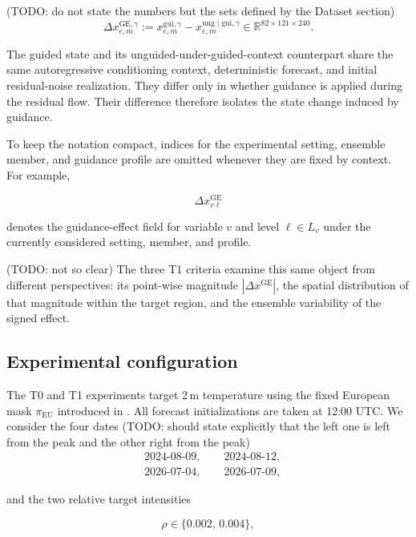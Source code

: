 (TODO: do not state the numbers but the sets defined by the Dataset section)
\begin{equation}
    \Delta x_{e,m}^{\mathrm{GE},\gamma}
    :=
    x_{e,m}^{\mathrm{gui},\gamma}
    -
    x_{e,m}^{\mathrm{ung}\mid\mathrm{gui},\gamma}
    \in
    \mathbb{R}^{82\times121\times240}.
    \label{eq:guidance-effect}
\end{equation}

The guided state and its unguided-under-guided-context counterpart share the
same autoregressive conditioning context, deterministic forecast, and initial
residual-noise realization. They differ only in whether guidance is applied
during the residual flow. Their difference therefore isolates the state change
induced by guidance.

To keep the notation compact, indices for the experimental setting, ensemble
member, and guidance profile are omitted whenever they are fixed by context.
For example,

\[
    \Delta x_{v\ell}^{\mathrm{GE}}
\]

denotes the guidance-effect field for variable $v$ and level
$\ell\in L_v$ under the currently considered setting, member, and profile.

(TODO: not so clear)
The three T1 criteria examine this same object from different perspectives:
its point-wise magnitude
$|\Delta x^{\mathrm{GE}}|$, the spatial distribution of that magnitude within
the target region, and the ensemble variability of the signed effect.

\subsection{Experimental configuration}
\label{sec:experimental-configuration}

The T0 and T1 experiments target 2\,m temperature using the fixed European
mask $\pi_{\mathrm{EU}}$ introduced in . All
forecast initializations are taken at 12:00 UTC. We consider the four dates
(TODO: should state explicitly that the left one is left from the peak and the other right from the peak)
\[
\begin{aligned}
    &\text{2024-08-09}, \qquad
    \text{2024-08-12}, \\
    &\text{2026-07-04}, \qquad
    \text{2026-07-09},
\end{aligned}
\]

and the two relative target intensities

\begin{equation}
    \rho \in \{0.002,\,0.004\},
    \label{eq:t1-target-intensities}
\end{equation}

